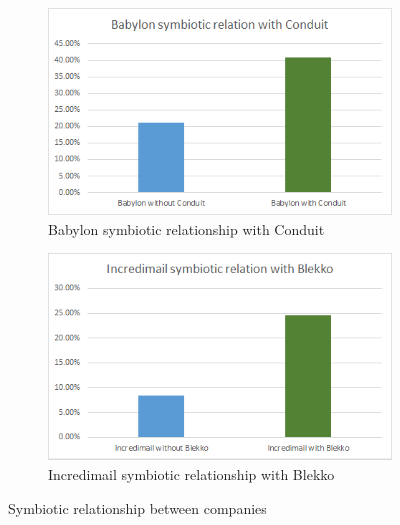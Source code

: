 \documentclass[11pt,oneside]{book}
\begin{document}
{{{{\begin{figure}[h]
\centering
\begin{subfigure}[b]{0.49\textwidth}
	\centering
\includegraphics[scale=0.49]{figures/babylon_sym_conduit.png}
\caption{Babylon symbiotic relationship with Conduit}
\label{fig:babylon_sym_conduit}
\end{subfigure}
\begin{subfigure}[b]{0.49\textwidth}
	\centering
\includegraphics[scale=0.49]{figures/incredi_sym_blekko.png}
\caption{Incredimail symbiotic relationship with Blekko}
\label{fig:incredi_sym_blekko}
\end{subfigure}
\caption{Symbiotic relationship between companies}
	\label{fig:symbiotic_pagerank}
\end{figure}

}}}}
\end{document}
